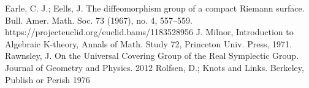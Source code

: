 \documentclass{amsart}
\theoremstyle{definition}
\theoremstyle{remark}
\begin{document}
\begin{thebibliography}{9}
 Earle, C. J.; Eells, J. The diffeomorphism group of a compact Riemann surface. Bull. Amer. Math. Soc. 73 (1967), no. 4, 557--559. https://projecteuclid.org/euclid.bams/1183528956
 J. Milnor, Introduction to Algebraic K-theory, Annals of Math. Study 72,
Princeton Univ. Press, 1971.
 Rawnsley, J. On the Universal Covering Group of the Real Symplectic Group. Journal of Geometry and Physics. 2012
 Rolfsen, D.; Knots and Links. Berkeley, Publish or Perish 1976
\end{thebibliography}
\end{document}
